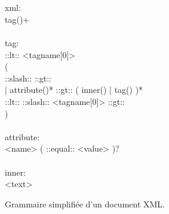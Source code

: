 \begin{figure}

\begin{bigpre}
\\
\\
xml: \\
    tag()+ \\
\\
tag: \\
    ::lt:: <tagname[0]> \\
    ( \\
      ::slash:: ::gt:: \\
    | attribute()* ::gt:: ( inner() | tag() )* \\
      ::lt:: ::slash:: <tagname[0]> ::gt:: \\
    ) \\
\\
attribute: \\
    <name> ( ::equal:: <value> )? \\
\\
inner: \\
    <text>
\end{bigpre}

\caption{\label{figure:data:xml} Grammaire simplifiée d'un document XML.}

\end{figure}

